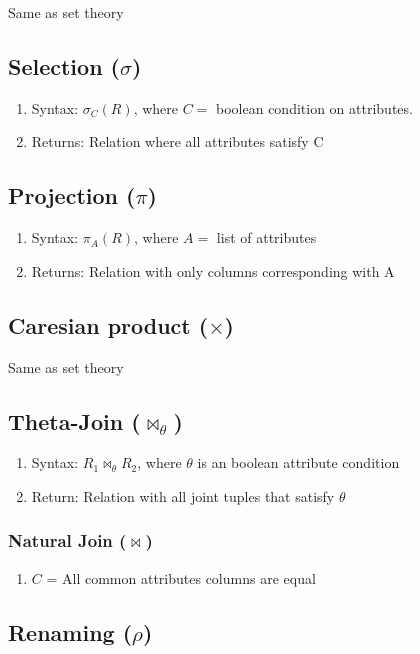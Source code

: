 \documentclass[11pt]{article}
\begin{document}
   Same as set theory
\subsection{Selection ($\sigma$)}
\label{sec-4.4}

\begin{enumerate}
\item Syntax: $\sigma_C(R)$, where $C=$ boolean condition on attributes.
\item Returns: Relation where all attributes satisfy C
\end{enumerate}
\subsection{Projection ($\pi$)}
\label{sec-4.5}

\begin{enumerate}
\item Syntax: $\pi_A(R)$, where $A=$ list of attributes
\item Returns: Relation with only columns corresponding with A
\end{enumerate}
\subsection{Caresian product ($\times$)}
\label{sec-4.6}

   Same as set theory
\subsection{Theta-Join ($\bowtie_\theta$)}
\label{sec-4.7}

\begin{enumerate}
\item Syntax: $R_1 \bowtie_\theta R_2$, where $\theta$ is an boolean attribute condition
\item Return: Relation with all joint tuples that satisfy $\theta$
\end{enumerate}
\subsubsection{Natural Join ($\bowtie$)}
\label{sec-4.7.1}

\begin{enumerate}
\item $C$ = All common attributes columns are equal
\end{enumerate}
\subsection{Renaming ($\rho$)}
\label{sec-4.8}
\end{document}

